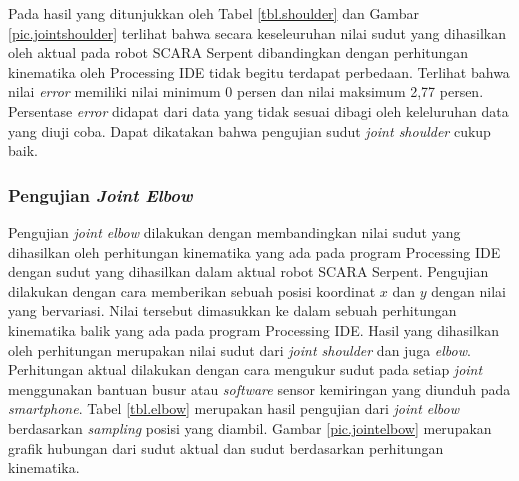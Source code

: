 Pada hasil yang ditunjukkan oleh Tabel \ref{tbl.shoulder} dan Gambar \ref{pic.jointshoulder} terlihat bahwa secara keseleuruhan nilai sudut yang dihasilkan oleh aktual pada robot SCARA Serpent dibandingkan dengan perhitungan kinematika oleh Processing IDE tidak begitu terdapat perbedaan. Terlihat bahwa nilai \textit{error}
memiliki nilai minimum 0 persen dan nilai maksimum 2,77 persen. Persentase \textit{error} didapat dari data yang tidak sesuai dibagi oleh keleluruhan data yang diuji coba. Dapat dikatakan bahwa pengujian sudut \textit{joint shoulder} cukup baik.

\subsubsection{Pengujian \textit{Joint Elbow}}

Pengujian \textit{joint elbow} dilakukan dengan membandingkan nilai sudut yang dihasilkan oleh perhitungan kinematika yang ada pada program Processing IDE dengan sudut yang dihasilkan dalam aktual robot SCARA Serpent. Pengujian dilakukan dengan cara memberikan sebuah posisi koordinat $x$ dan $y$ dengan nilai yang bervariasi. Nilai tersebut dimasukkan ke dalam sebuah perhitungan kinematika balik yang ada pada program Processing IDE. Hasil yang dihasilkan oleh perhitungan merupakan nilai sudut dari \textit{joint shoulder} dan juga \textit{elbow}. Perhitungan aktual dilakukan dengan cara mengukur sudut pada setiap \textit{joint} menggunakan bantuan busur atau \textit{software} sensor kemiringan yang diunduh pada \textit{smartphone}. Tabel \ref{tbl.elbow} merupakan hasil pengujian dari \textit{joint elbow} berdasarkan \textit{sampling} posisi yang diambil. Gambar \ref{pic.jointelbow} merupakan grafik hubungan dari sudut aktual dan sudut berdasarkan perhitungan kinematika. 
\fontsize{8}{10}\selectfont
